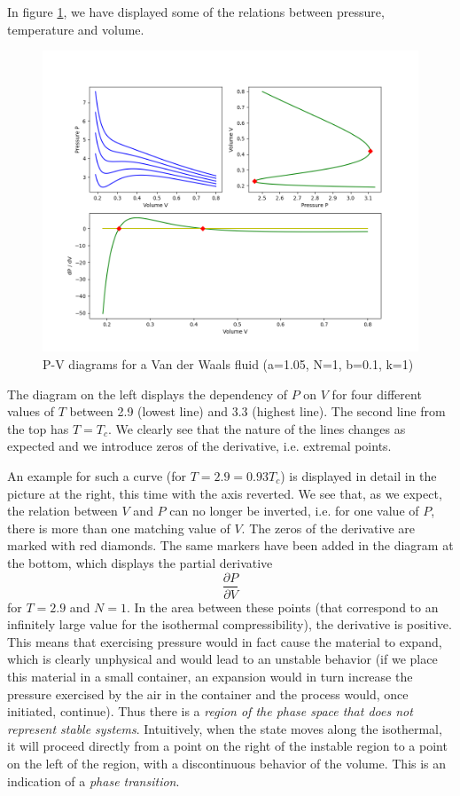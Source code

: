 \documentclass[a4paper, draft]{article}
\theoremstyle{own}
\theoremstyle{remark}
\begin{document}
In figure \ref{fig:VanDerWaals}, we have displayed some of the relations between pressure, temperature and volume. 


\begin{figure}[ht]
\centering
\includegraphics[scale=.5]{VanDerWaals}
\caption{P-V diagrams for a Van der Waals fluid (a=1.05, N=1, b=0.1, k=1)}
\label{fig:VanDerWaals}
\end{figure}

The diagram on the left displays the dependency of $P$ on $V$ for four different values of $T$ between 2.9 (lowest line) and 3.3 (highest line). The second line from the top has $T = T_c$. We clearly see that the nature of the lines changes as expected and we introduce zeros of the derivative, i.e. extremal points. 

An example for such a curve (for $T=2.9 = 0.93 T_c$) is displayed in detail in the picture at the right, this time with the axis reverted. We see that, as we expect, the relation between $V$ and $P$ can no longer be inverted, i.e. for one value of $P$, there is more than one matching value of $V$. The zeros of the derivative are marked with red diamonds. The same markers have been added in the diagram at the bottom, which displays the partial derivative
$$
\frac{\partial{P}}{\partial V}
$$	
for $T=2.9$ and $N=1$. In the area between these points (that correspond to an infinitely large value for the isothermal compressibility), the derivative is positive. This means that exercising pressure would in fact cause the material to expand, which is clearly unphysical and would lead to an unstable behavior  (if we place this material in a small container, an expansion would in turn increase the pressure exercised by the air in the container and the process would, once initiated, continue). Thus there is a {\em region of the phase space that does not represent stable systems}. Intuitively, when the state moves along the isothermal, it will proceed directly from a point on the right of the instable region to a point on the left of the region, with a discontinuous behavior of the volume. This is an indication of a {\em phase transition}.
\end{document}
